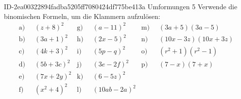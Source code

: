 \begin{exercise}
      {ID-2ea00322894fadba5205ff7080424df775be413a}
      {Umformungen 5}
  \ifproblem\problem
    \newcommand{\gap}{\;\;}%
    Verwende die binomischen Formeln, um die Klammern aufzulösen:
    \begin{align*}
      \text{a)}\gap & (z+8)^2  &
      \text{g)}\gap & (a-11)^2  &
      \text{m)}\gap & (3a+5)(3a-5)
      \\
      \text{b)}\gap & (3a+1)^2  &
      \text{h)}\gap & (2x-5)^2  &
      \text{n)}\gap & (10x-3z)(10x+3z)
      \\
      \text{c)}\gap & (4k+3)^2 &
      \text{i)}\gap & (5p-q)^2 &
      \text{o)}\gap & (r^2+1)(r^2-1)
      \\
      \text{d)}\gap & (5b+3c)^2   &
      \text{j)}\gap & (3e-2f)^2 &
      \text{p)}\gap & (7-x)(7+x)
      \\
      \text{e)}\gap & (7x+2y)^2 &
      \text{k)}\gap & (6-5z)^2 &
      \\
      \text{f)}\gap & (x^2+4)^2 &
      \text{l)}\gap & (10ab-2a)^2 &
    \end{align*}
  \fi
  \ifoutcome\outcome
    \newcommand{\toprow}[1]
    {%
      \makebox[20em][l]
      {%
        \ensuremath
        {%
          \displaystyle
          \phantom{\,=\:\,}%
          #1%
        }%
      }%
    }%

    \newcommand{\solutionA} { \text{a)}&\quad          (z+8)^2=z^2+16z+256           }
    \newcommand{\solutionB} { \text{b)}&\quad         (3a+1)^2=9a^2+6a+1             }
    \newcommand{\solutionC} { \text{c)}&\quad         (4k+3)^2=16k^2+24k+9           }
    \newcommand{\solutionD} { \text{d)}&\quad        (5b+3c)^2=25b^2+30bc+9c^2       }
    \newcommand{\solutionE} { \text{e)}&\quad        (7x+2y)^2=49x^2+28xy+4y^2       }
    \newcommand{\solutionF} { \text{f)}&\quad        (x^2+4)^2=x^4+8x^2+16           }
    \newcommand{\solutionG} { \text{g)}&\quad         (a-11)^2=a^2-22a+121           }
    \newcommand{\solutionH} { \text{h)}&\quad         (2x-5)^2=4x^2-20x+25           }
    \newcommand{\solutionI} { \text{i)}&\quad         (5p-q)^2=25p^2-10pq+q^2        }
    \newcommand{\solutionJ} { \text{j)}&\quad        (3e-2f)^2=9e^2-12ef+4f^2        }
    \newcommand{\solutionK} { \text{k)}&\quad         (6-5z)^2=36-60z+25z^2          }
    \newcommand{\solutionL} { \text{l)}&\quad      (10ab-2a)^2=100a^2b^2-40a^2b+4a^2 }
    \newcommand{\solutionM} { \text{m)}&\quad     (3a+5)(3a-5)=9a^2-25               }
    \newcommand{\solutionN} { \text{n)}&\quad (10x-3z)(10x+3z)=100x^2-9z^2           }
    \newcommand{\solutionO} { \text{o)}&\quad   (r^2+1)(r^2-1)=r^4-1                 }
    \newcommand{\solutionP} { \text{p)}&\quad       (7-x)(7+x)=49-x^2                }


\end{exercise}
